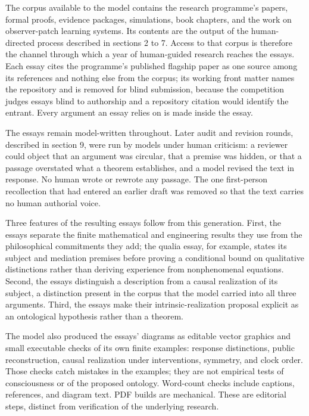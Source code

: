 \documentclass[
  11pt,
]{article}
\begin{document}
The corpus available to the model contains the research programme's
papers, formal proofs, evidence packages, simulations, book chapters,
and the work on observer-patch learning systems. Its contents are the
output of the human-directed process described in sections 2 to 7.
Access to that corpus is therefore the channel through which a year of
human-guided research reaches the essays. Each essay cites the
programme's published flagship paper as one source among its
references and nothing else from the corpus; its working front matter
names the repository and is removed for blind submission, because the
competition judges essays blind to authorship and a repository citation
would identify the entrant. Every argument an essay relies on is made
inside the essay.

The essays remain model-written throughout. Later audit and revision
rounds, described in section 9, were run by models under human
criticism: a reviewer could object that an argument was circular, that a
premise was hidden, or that a passage overstated what a theorem
establishes, and a model revised the text in response. No human wrote or
rewrote any passage. The one first-person recollection that had entered
an earlier draft was removed so that the text carries no human authorial
voice.

Three features of the resulting essays follow from this generation.
First, the essays separate the finite mathematical and engineering
results they use from the philosophical commitments they add; the qualia
essay, for example, states its subject and mediation premises before
proving a conditional bound on qualitative distinctions rather than
deriving experience from nonphenomenal equations. Second, the essays
distinguish a description from a causal realization of its subject, a
distinction present in the corpus that the model carried into all three
arguments. Third, the essays make their intrinsic-realization proposal
explicit as an ontological hypothesis rather than a theorem.

The model also produced the essays' diagrams as editable vector graphics
and small executable checks of its own finite examples: response
distinctions, public reconstruction, causal realization under
interventions, symmetry, and clock order. Those checks catch mistakes in
the examples; they are not empirical tests of consciousness or of the
proposed ontology. Word-count checks include captions, references, and
diagram text. PDF builds are mechanical. These are editorial steps,
distinct from verification of the underlying research.
\end{document}
